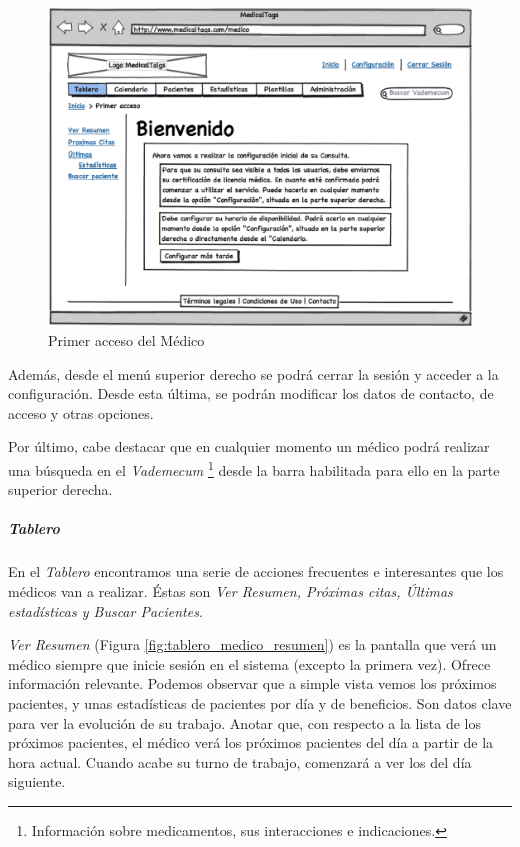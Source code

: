 \documentclass[a4paper,oneside,11pt]{book}
\begin{document}
		\begin{figure}[H]
		  \centering
		    \includegraphics[width=12cm]{img/eps/7_Dashboar_Medico_Inicial.eps}
		  \caption{Primer acceso del Médico}
		  \label{fig:tablero_medico_inicial}
		\end{figure}
	
		Además, desde el menú superior derecho se podrá cerrar la sesión y acceder a la configuración. Desde esta última, se podrán modificar los datos de contacto, de acceso y otras opciones.
		
		 Por último, cabe destacar que en cualquier momento un médico podrá realizar una búsqueda en el \textit{Vademecum} \footnote{Información sobre medicamentos, sus interacciones e indicaciones.} desde la barra habilitada para ello en la parte superior derecha.
		
		\subparagraph{Tablero} %
		\label{par:medico_tablero}
		
			En el \textit{Tablero} encontramos una serie de acciones frecuentes e interesantes que los médicos van a realizar. Éstas son \textit{Ver Resumen, Próximas citas, Últimas estadísticas y Buscar Pacientes}.
			
			\textit{Ver Resumen} (Figura \ref{fig:tablero_medico_resumen}) es la pantalla que verá un médico siempre que inicie sesión en el sistema (excepto la primera vez). Ofrece información relevante. Podemos observar que a simple vista vemos los próximos pacientes, y unas estadísticas de pacientes por día y de beneficios. Son datos clave para ver la evolución de su trabajo. Anotar que, con respecto a la lista de los próximos pacientes, el médico verá los próximos pacientes del día a partir de la hora actual. Cuando acabe su turno de trabajo, comenzará a ver los del día siguiente.
		
\end{document}
